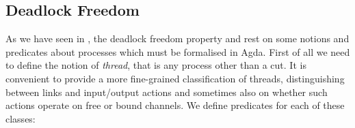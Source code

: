 \subsection{Deadlock Freedom}
\label{sec:deadlock-freedom-agda}

As we have seen in , the deadlock freedom property and
 rest on some notions and predicates about processes which must be
formalised in Agda. First of all we need to define the notion of \emph{thread},
that is any process other than a cut. It is convenient to provide a more
fine-grained classification of threads, distinguishing between links and
input/output actions and sometimes also on whether such actions operate on free
or bound channels. We define predicates for each of these classes:

\begin{code}[hide]%
\>[0]\AgdaSymbol{\{-\#}\AgdaSpace{}%
\AgdaSpace{}%
\AgdaSpace{}%
\AgdaSymbol{\#-\}}\<%
\\
\>[0]\AgdaSpace{}%
\AgdaSpace{}%
\AgdaSpace{}%
\AgdaSpace{}%
\AgdaSymbol{(}\AgdaSymbol{)}\<%
\\
\>[0]\AgdaSpace{}%
\AgdaSpace{}%
\<%
\\
\>[0]\AgdaSpace{}%
\AgdaSpace{}%
\AgdaSpace{}%
\AgdaSpace{}%
\AgdaSymbol{(}\AgdaSymbol{;}\AgdaSpace{}%
\AgdaOperator{\AgdaInductiveConstructor{\AgdaUnderscore{},\AgdaUnderscore{}}}\AgdaSymbol{;}\AgdaSpace{}%
\AgdaSymbol{;}\AgdaSpace{}%
\AgdaSymbol{)}\<%
\\
\>[0]\AgdaSpace{}%
\AgdaSpace{}%
\AgdaSpace{}%
\AgdaSpace{}%
\AgdaSymbol{(}\AgdaInductiveConstructor{[]}\AgdaSymbol{;}\AgdaSpace{}%
\AgdaSymbol{;}\AgdaSpace{}%
\AgdaOperator{\AgdaFunction{[\AgdaUnderscore{}]}}\AgdaSymbol{)}\<%
\\
\>[0]\AgdaSpace{}%
\AgdaSpace{}%
\AgdaSpace{}%
\AgdaSpace{}%
\AgdaSymbol{(}\AgdaSymbol{;}\AgdaSpace{}%

\end{code}
